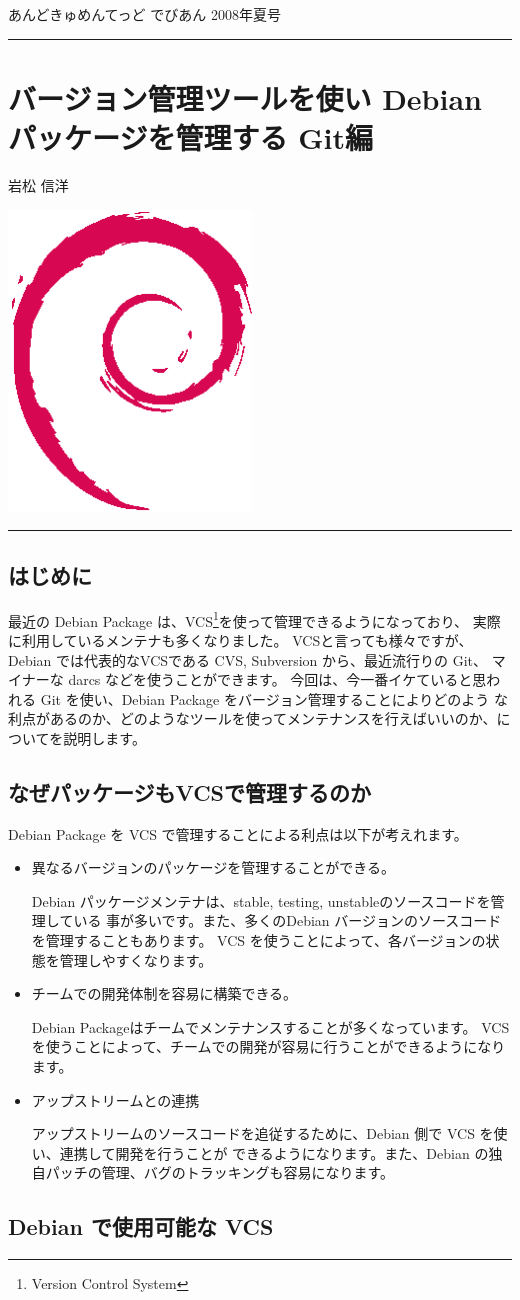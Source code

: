 \documentclass[mingoth,a4paper]{jsarticle}
\renewcommand{\dancersection}[2]{%
\newpage
あんどきゅめんてっど でびあん 2008年夏号
%
\vspace{0.1mm}\\
{\color{dancerlightblue}\rule{\hsize}{2mm}}

%
%
\begin{minipage}[t]{0.6\hsize}
\color{dancerdarkblue}
\vspace{1cm}
\section{#1}
\hfill{}#2\\
\end{minipage}
\begin{minipage}[t]{0.4\hsize}
\vspace{-2cm}
\hfill{}\includegraphics[height=8cm]{image200502/openlogo-nd.eps}\\
\vspace{-5cm}
\end{minipage}
%
%
{\color{dancerdarkblue}\rule{0.74\hsize}{2mm}}
%
\vspace{2cm}
}
\begin{document}
\dancersection{バージョン管理ツールを使い Debian パッケージを管理する Git編}{岩松 信洋}
\label{sec:vcsgit}

\subsection{はじめに}
最近の Debian Package は、VCS\footnote{Version Control System}を使って管理できるようになっており、
実際に利用しているメンテナも多くなりました。
VCSと言っても様々ですが、Debian では代表的なVCSである CVS, Subversion から、最近流行りの Git、
マイナーな darcs などを使うことができます。
今回は、今一番イケていると思われる Git を使い、Debian Package をバージョン管理することによりどのよう
な利点があるのか、どのようなツールを使ってメンテナンスを行えばいいのか、についてを説明します。

\subsection{なぜパッケージもVCSで管理するのか}
Debian Package を VCS で管理することによる利点は以下が考えれます。

\begin{itemize}
  \item 異なるバージョンのパッケージを管理することができる。
    
    Debian パッケージメンテナは、stable, testing, unstableのソースコードを管理している
    事が多いです。また、多くのDebian バージョンのソースコードを管理することもあります。
    VCS を使うことによって、各バージョンの状態を管理しやすくなります。

  \item チームでの開発体制を容易に構築できる。

    Debian Packageはチームでメンテナンスすることが多くなっています。
    VCS を使うことによって、チームでの開発が容易に行うことができるようになります。

  \item アップストリームとの連携

    アップストリームのソースコードを追従するために、Debian 側で VCS を使い、連携して開発を行うことが
    できるようになります。また、Debian の独自パッチの管理、バグのトラッキングも容易になります。
\end{itemize}

\subsection{Debian で使用可能な VCS}
\end{document}
